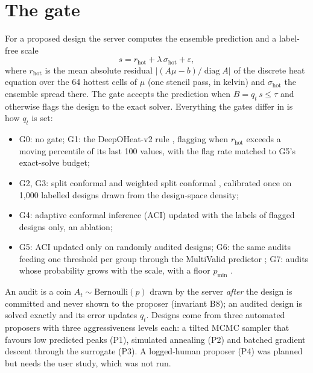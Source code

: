 \section{The gate}
\label{sec:dl-gate}
For a proposed design the server computes the ensemble prediction and a label-free scale
\[
  s = r_{\mathrm{hot}} + \lambda\,\sigma_{\mathrm{hot}} + \varepsilon ,
\]
where $r_{\mathrm{hot}}$ is the mean absolute residual $|(A\mu-b)/\operatorname{diag}A|$ of the
discrete heat equation over the 64 hottest cells of $\mu$ (one stencil pass, in kelvin) and
$\sigma_{\mathrm{hot}}$ the ensemble spread there. The gate accepts the prediction when
$B = q_t\,s \le \tau$ and otherwise flags the design to the exact solver. Everything the gates
differ in is how $q_t$ is set:
\begin{itemize}
\item G0: no gate; G1: the DeepOHeat-v2 rule \cite{deepoheatv2}, flagging when $r_{\mathrm{hot}}$
exceeds a moving percentile of its last 100 values, with the flag rate matched to G5's
exact-solve budget;
\item G2, G3: split conformal and weighted split conformal \cite{tibshirani2019,fannjiang2022,choi2026},
calibrated once on 1{,}000 labelled designs drawn from the design-space density;
\item G4: adaptive conformal inference (ACI) \cite{gibbs2021aci} updated with the labels of
flagged designs only, an ablation;
\item G5: ACI updated only on randomly audited designs; G6: the same audits feeding one threshold
per group through the MultiValid predictor \cite{bastani2022mvp}; G7: audits whose probability
grows with the scale, with a floor $p_{\min}$ \cite{zrnic2024}.
\end{itemize}
An audit is a coin $A_t\sim\mathrm{Bernoulli}(p)$ drawn by the server \emph{after} the design is
committed and never shown to the proposer (invariant B8); an audited design is solved exactly and
its error updates $q_t$. Designs come from three automated proposers with three aggressiveness
levels each: a tilted MCMC sampler that favours low predicted peaks (P1), simulated annealing
(P2) and batched gradient descent through the surrogate (P3). A logged-human proposer (P4) was
planned but needs the user study, which was not run.

